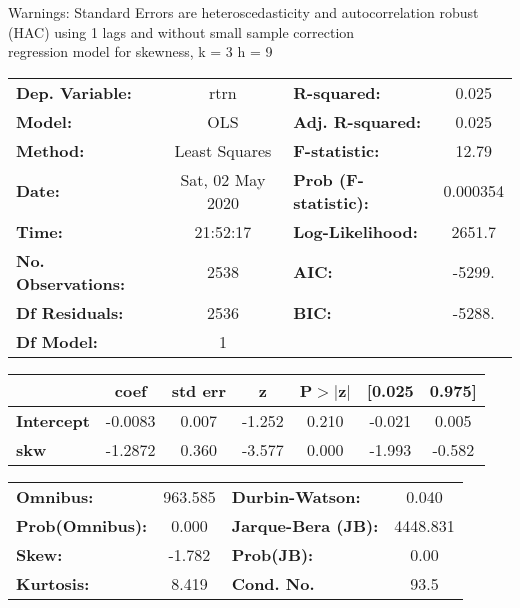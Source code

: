 Warnings: \newline
 [1] Standard Errors are heteroscedasticity and autocorrelation robust (HAC) using 1 lags and without small sample correction\\ 

regression model for skewness, k = 3 h = 9\begin{center}
\begin{tabular}{lclc}
\toprule
\textbf{Dep. Variable:}    &       rtrn       & \textbf{  R-squared:         } &     0.025   \\
\textbf{Model:}            &       OLS        & \textbf{  Adj. R-squared:    } &     0.025   \\
\textbf{Method:}           &  Least Squares   & \textbf{  F-statistic:       } &     12.79   \\
\textbf{Date:}             & Sat, 02 May 2020 & \textbf{  Prob (F-statistic):} &  0.000354   \\
\textbf{Time:}             &     21:52:17     & \textbf{  Log-Likelihood:    } &    2651.7   \\
\textbf{No. Observations:} &        2538      & \textbf{  AIC:               } &    -5299.   \\
\textbf{Df Residuals:}     &        2536      & \textbf{  BIC:               } &    -5288.   \\
\textbf{Df Model:}         &           1      & \textbf{                     } &             \\
\bottomrule
\end{tabular}
\begin{tabular}{lcccccc}
                   & \textbf{coef} & \textbf{std err} & \textbf{z} & \textbf{P$> |$z$|$} & \textbf{[0.025} & \textbf{0.975]}  \\
\midrule
\textbf{Intercept} &      -0.0083  &        0.007     &    -1.252  &         0.210        &       -0.021    &        0.005     \\
\textbf{skw}       &      -1.2872  &        0.360     &    -3.577  &         0.000        &       -1.993    &       -0.582     \\
\bottomrule
\end{tabular}
\begin{tabular}{lclc}
\textbf{Omnibus:}       & 963.585 & \textbf{  Durbin-Watson:     } &    0.040  \\
\textbf{Prob(Omnibus):} &   0.000 & \textbf{  Jarque-Bera (JB):  } & 4448.831  \\
\textbf{Skew:}          &  -1.782 & \textbf{  Prob(JB):          } &     0.00  \\
\textbf{Kurtosis:}      &   8.419 & \textbf{  Cond. No.          } &     93.5  \\
\bottomrule
\end{tabular}
\end{center}

